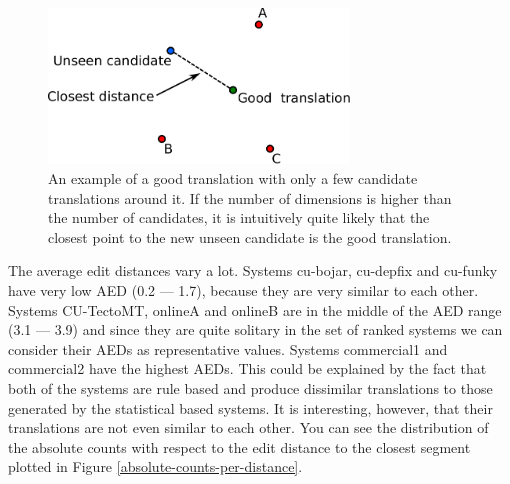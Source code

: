 \begin{figure}
    \begin{center}
        \includegraphics[width=8cm]{img/translation-space.pdf}
    \end{center}

    \caption[An illustration of a space of translations]{An example of a good
    translation with only a few candidate translations around it. If the number
  of dimensions is higher than the number of candidates, it is intuitively quite
likely that the closest point to the new unseen candidate is the good
translation.}
    \label{translation-space-illustration}
\end{figure}

The average edit distances vary a lot. Systems cu-bojar, cu-depfix and cu-funky
have very low AED (0.2 --- 1.7), because they are very similar to each other.
Systems CU-TectoMT, onlineA and onlineB are in the middle of the AED range (3.1
--- 3.9) and since they are quite solitary in the set of ranked systems we can
consider their AEDs as representative values.  Systems commercial1 and
commercial2 have the highest AEDs. This could be explained by the fact that
both of the systems are rule based and produce dissimilar translations to those
generated by the statistical based systems. It is interesting, however, that
their translations are not even similar to each other. You can see the distribution of the absolute
counts with respect to the edit distance to the closest segment plotted in Figure
\ref{absolute-counts-per-distance}.

